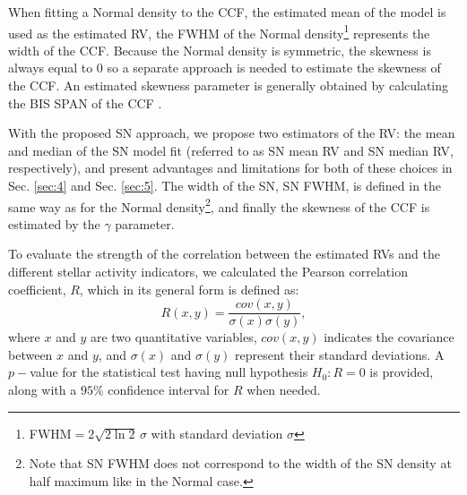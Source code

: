 \documentclass{aa}
\begin{document}

When fitting a Normal density to the CCF, the estimated mean of the model is used as the estimated RV, the FWHM of the Normal density\footnote{FWHM$=2\sqrt{2\ln2}\,\sigma$ with standard deviation $\sigma$} represents the width of the CCF.
Because the Normal density is symmetric, the skewness is always equal to 0 so a separate approach is needed to estimate the skewness of the CCF.
An estimated skewness parameter is generally obtained by calculating the BIS SPAN of the CCF \citep[see Sect. \ref{intro}, and e.g.][]{Queloz-2001}. 
%

With the proposed SN approach, we propose two estimators of the RV: the mean and median of the SN model fit (referred to as SN mean RV and SN median RV, respectively), and present advantages and limitations for both of these choices in Sec. \ref{sec:4} and Sec. \ref{sec:5}. 
The width of the SN, SN FWHM, is defined in the same way as for the Normal density\footnote{Note that SN FWHM does not correspond to the width of the SN density at half maximum like in the Normal case.}, and finally the skewness of the CCF is estimated by the $\gamma$ parameter.

To evaluate the strength of the correlation between the estimated RVs and the different stellar activity indicators, we calculated the Pearson correlation coefficient, $R$, which in its general form is defined as:
%
\begin{equation}
R (x,y)= \frac{cov(x,y)}{\sigma(x)\sigma(y)},
\label{eq:Pearson:corr}
\end{equation}
%
where $x$ and $y$ are two quantitative variables, $cov(x,y)$ indicates the covariance between $x$ and $y$, and $\sigma(x)$ and $\sigma(y)$ represent their standard deviations.  A $p-$value for the statistical test having null hypothesis $H_{0}: R=0$ is provided, along with a $95\%$ confidence interval for $R$ when needed.
\end{document}
